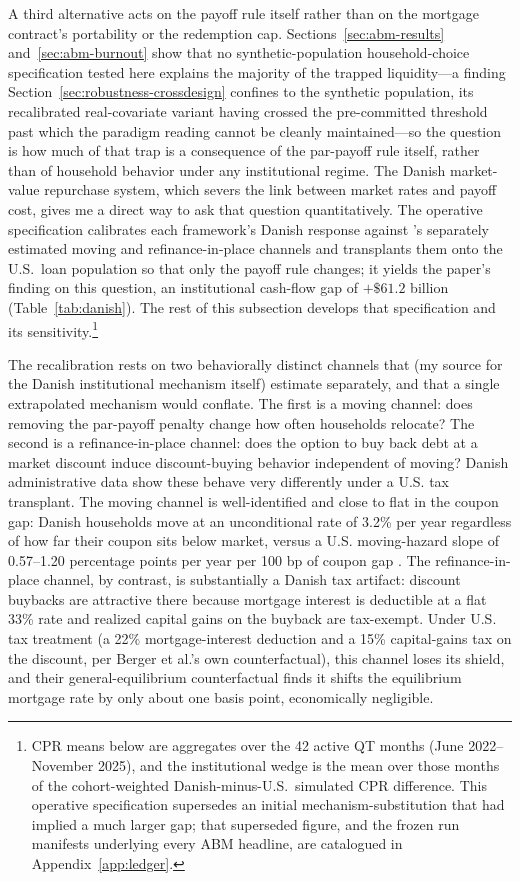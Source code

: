 \documentclass[12pt]{article}
\begin{document}
A third alternative acts on the payoff rule itself rather than on the mortgage contract's portability or the redemption cap. Sections~\ref{sec:abm-results} and~\ref{sec:abm-burnout} show that no synthetic-population household-choice specification tested here explains the majority of the trapped liquidity---a finding Section~\ref{sec:robustness-crossdesign} confines to the synthetic population, its recalibrated real-covariate variant having crossed the pre-committed threshold past which the paradigm reading cannot be cleanly maintained---so the question is how much of that trap is a consequence of the par-payoff rule itself, rather than of household behavior under any institutional regime. The Danish market-value repurchase system, which severs the link between market rates and payoff cost, gives me a direct way to ask that question quantitatively. The operative specification calibrates each framework's Danish response against \citet{berger2026}'s separately estimated moving and refinance-in-place channels and transplants them onto the U.S.\ loan population so that only the payoff rule changes; it yields the paper's finding on this question, an institutional cash-flow gap of $+\$61.2$ billion (Table~\ref{tab:danish}). The rest of this subsection develops that specification and its sensitivity.\footnote{\label{fn:manifest}CPR means below are aggregates over the 42 active QT months (June 2022--November 2025), and the institutional wedge is the mean over those months of the cohort-weighted Danish-minus-U.S.\ simulated CPR difference. This operative specification supersedes an initial mechanism-substitution that had implied a much larger gap; that superseded figure, and the frozen run manifests underlying every ABM headline, are catalogued in Appendix~\ref{app:ledger}.}

The recalibration rests on two behaviorally distinct channels that \citet{berger2026} (my source for the Danish institutional mechanism itself) estimate separately, and that a single extrapolated mechanism would conflate. The first is a moving channel: does removing the par-payoff penalty change how often households relocate? The second is a refinance-in-place channel: does the option to buy back debt at a market discount induce discount-buying behavior independent of moving? Danish administrative data show these behave very differently under a U.S. tax transplant. The moving channel is well-identified and close to flat in the coupon gap: Danish households move at an unconditional rate of 3.2\% per year regardless of how far their coupon sits below market, versus a U.S. moving-hazard slope of 0.57--1.20 percentage points per year per 100 bp of coupon gap \citep{fonseca2024}. The refinance-in-place channel, by contrast, is substantially a Danish tax artifact: discount buybacks are attractive there because mortgage interest is deductible at a flat 33\% rate and realized capital gains on the buyback are tax-exempt. Under U.S. tax treatment (a 22\% mortgage-interest deduction and a 15\% capital-gains tax on the discount, per Berger et al.'s own counterfactual), this channel loses its shield, and their general-equilibrium counterfactual finds it shifts the equilibrium mortgage rate by only about one basis point, economically negligible.
\end{document}
